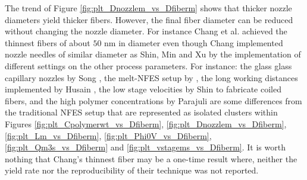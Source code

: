 The trend of Figure \ref{fig:plt_Dnozzlem_vs_Dfiberm} shows that thicker nozzle diameters yield thicker fibers. However, the final fiber diameter can be reduced without changing the nozzle diameter. For instance Chang et al. \cite{Chang2008} achieved the thinnest fibers of about $50 \textrm{ nm}$ in diameter even though Chang implemented nozzle needles of similar diameter as Shin, Min and Xu by the implementation of different settings on the other process parameters. For instance: the glass glass capillary nozzles by Song \cite{Song2015}, the melt-NFES setup by \cite{Brown2011, Brown2014}, the long working distances implemented by Husain \cite{Husain2016}, the low stage velocities by Shin \cite{Shin2019} to fabricate coiled fibers, and the high polymer concentrations by Parajuli \cite{Parajuli2016} are some differences from the traditional NFES setup that are represented as isolated clusters within Figures \ref{fig:plt_Cpolymerwt_vs_Dfiberm}, \ref{fig:plt_Dnozzlem_vs_Dfiberm}, \ref{fig:plt_Lm_vs_Dfiberm}, \ref{fig:plt_Phi0V_vs_Dfiberm}, \ref{fig:plt_Qm3s_vs_Dfiberm} and \ref{fig:plt_vstagems_vs_Dfiberm}. It is worth nothing that Chang's thinnest fiber may be a one-time result where, neither the yield rate nor the reproducibility of their technique was not reported.

